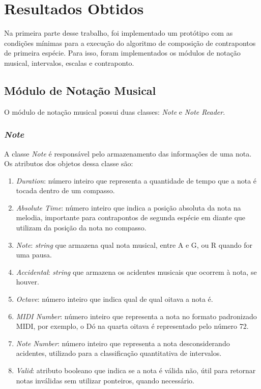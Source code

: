 \chapter[Resultados Obtidos]{Resultados Obtidos}

  Na primeira parte desse trabalho, foi implementado um protótipo com as condições mínimas para a execução do algoritmo de composição de contrapontos de primeira espécie. Para isso, foram implementados os módulos de notação musical, intervalos, escalas e contraponto.

  \section[Módulo de Notação Musical]{Módulo de Notação Musical}

    O módulo de notação musical possui duas classes: \textit{Note} e \textit{Note Reader}.

    \subsection[\textit{Note}]{\textit{Note}}

      A classe \textit{Note} é responsável pelo armazenamento das informações de uma nota. Os atributos dos objetos dessa classe são:

      \begin{enumerate}
        \item \textit{Duration}: número inteiro que representa a quantidade de tempo que a nota é tocada dentro de um compasso.
        \item \textit{Absolute Time}: número inteiro que indica a posição absoluta da nota na melodia, importante para contrapontos de segunda espécie em diante que utilizam da posição da nota no compasso.
        \item \textit{Note}: \textit{string} que armazena qual nota musical, entre A e G, ou R quando for uma pausa.
        \item \textit{Accidental}: \textit{string} que armazena os acidentes musicais que ocorrem à nota, se houver.
        \item \textit{Octave}: número inteiro que indica qual de qual oitava a nota é.
        \item \textit{MIDI Number}: número inteiro que representa a nota no formato padronizado MIDI, por exemplo, o Dó na quarta oitava é representado pelo número 72.
        \item \textit{Note Number}: número inteiro que representa a nota desconsiderando acidentes, utilizado para a classificação quantitativa de intervalos.
        \item \textit{Valid}: atributo booleano que indica se a nota é válida não, útil para retornar notas inválidas sem utilizar ponteiros, quando necessário.
      \end{enumerate}

